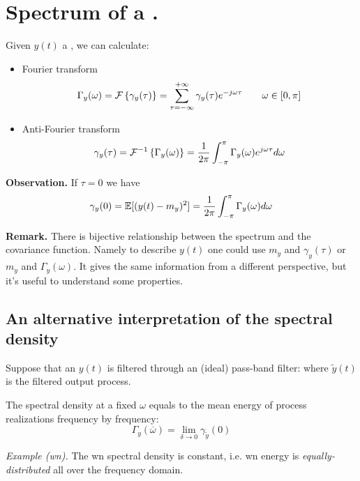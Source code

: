 \section{Spectrum of a \ssp.}
Given $y(t)$ a \ssp, we can calculate:
\begin{itemize}
	\item Fourier transform
	\[
		\Gamma _{y}(\omega)=\mathcal{F}\left\{\gamma _{y}(\tau )\right\}=\sum_{\tau =-\infty }^{+\infty} \gamma _{y}(\tau ) e^{-j\omega \tau } \qquad \omega \in [0,\pi ]
	\]
	\item Anti-Fourier transform
	\[
		\gamma _{y}(\tau)=\mathcal{F}^{-1}\left\{\Gamma _{y}(\omega)\right\}=\frac{1}{2\pi }\int_{-\pi }^{\pi } \Gamma _{y}(\omega )e^{j\omega \tau }d\omega  
	\]
\end{itemize}

\textbf{Observation.}
If $\tau =0$ we have
\[
	\gamma _{y}(0)=\mathbb{E}[(y(t)-m_{y})^2 ]=\frac{1}{2\pi }\int_{-\pi }^{\pi } \Gamma _{y}(\omega )d\omega 
\]

\textbf{Remark.}
There is bijective relationship between the spectrum and the covariance function. Namely to describe $y(t)$ one could use $m_{y}$ and $\gamma _{y}(\tau )$ or $m_{y}$ and $\Gamma _{y}(\omega)$. It gives the same information from a different perspective, but it's useful to understand some properties.

\subsection{An alternative interpretation of the spectral density}
Suppose that an \ssp $y(t)$ is filtered through an (ideal) pass-band filter:
where $\tilde{y}(t)$ is the filtered output process.
\begin{theorem}
	The spectral density at a fixed $\omega$ equals to the mean energy of process realizations frequency by frequency:
	\[
		\Gamma _{y}(\overline{\omega})=\lim_{\delta  \to 0} \gamma _{\tilde{y}}(0)
	\]
\end{theorem}

\emph{Example (\gls{wn}).}
The \gls{wn} spectral density is constant, i.e. \gls{wn} energy is \emph{equally-distributed} all over the frequency domain.

